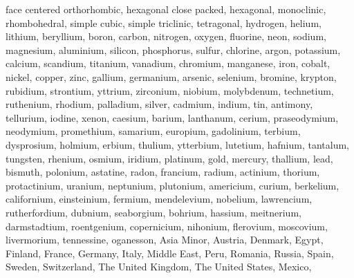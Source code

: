 face centered orthorhombic,
hexagonal close packed,
hexagonal,
monoclinic,
rhombohedral,
simple cubic,
simple triclinic,
tetragonal,
hydrogen,
helium,
lithium,
beryllium,
boron,
carbon,
nitrogen,
oxygen,
fluorine,
neon,
sodium,
magnesium,
aluminium,
silicon,
phosphorus,
sulfur,
chlorine,
argon,
potassium,
calcium,
scandium,
titanium,
vanadium,
chromium,
manganese,
iron,
cobalt,
nickel,
copper,
zinc,
gallium,
germanium,
arsenic,
selenium,
bromine,
krypton,
rubidium,
strontium,
yttrium,
zirconium,
niobium,
molybdenum,
technetium,
ruthenium,
rhodium,
palladium,
silver,
cadmium,
indium,
tin,
antimony,
tellurium,
iodine,
xenon,
caesium,
barium,
lanthanum,
cerium,
praseodymium,
neodymium,
promethium,
samarium,
europium,
gadolinium,
terbium,
dysprosium,
holmium,
erbium,
thulium,
ytterbium,
lutetium,
hafnium,
tantalum,
tungsten,
rhenium,
osmium,
iridium,
platinum,
gold,
mercury,
thallium,
lead,
bismuth,
polonium,
astatine,
radon,
francium,
radium,
actinium,
thorium,
protactinium,
uranium,
neptunium,
plutonium,
americium,
curium,
berkelium,
californium,
einsteinium,
fermium,
mendelevium,
nobelium,
lawrencium,
rutherfordium,
dubnium,
seaborgium,
bohrium,
hassium,
meitnerium,
darmstadtium,
roentgenium,
copernicium,
nihonium,
flerovium,
moscovium,
livermorium,
tennessine,
oganesson,
Asia Minor,
Austria,
Denmark,
Egypt,
Finland,
France,
Germany,
Italy,
Middle East,
Peru,
Romania,
Russia,
Spain,
Sweden,
Switzerland,
The United Kingdom,
The United States,
Mexico,
